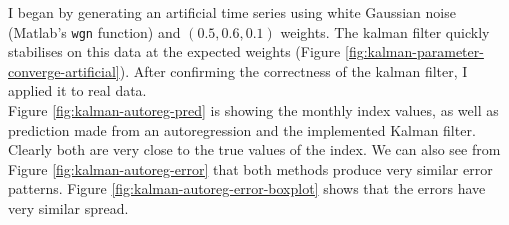 \documentclass[11pt, fleqn]{article}
\begin{document}
I began by generating an artificial time series using white Gaussian noise (Matlab's \texttt{wgn} function) and $(0.5, 0.6, 0.1)$ weights. The kalman filter quickly stabilises on this data at the expected weights (Figure \ref{fig:kalman-parameter-converge-artificial}). After confirming the correctness of the kalman filter, I applied it to real data.\\

Figure \ref{fig:kalman-autoreg-pred} is showing the monthly index values, as well as prediction made from an autoregression and the implemented Kalman filter. Clearly both are very close to the true values of the index. We can also see from Figure \ref{fig:kalman-autoreg-error} that both methods produce very similar error patterns. Figure \ref{fig:kalman-autoreg-error-boxplot} shows that the errors have very similar spread.\\
\end{document}
